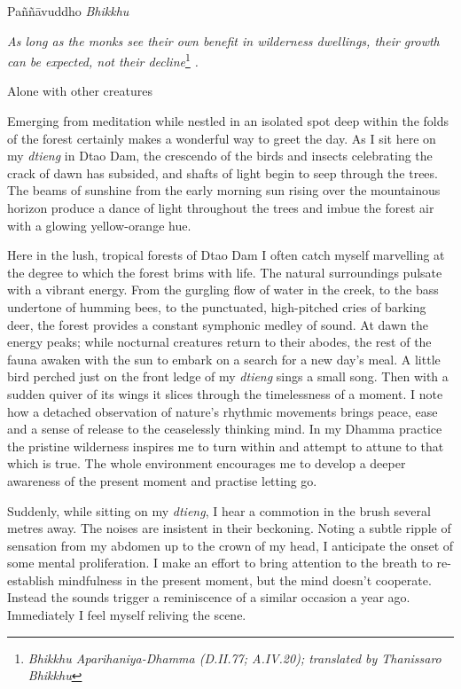 
Paññāvuddho \emph{Bhikkhu}

\emph{As long as the monks see their own benefit in wilderness
dwellings, their growth can be expected, not their decline}\footnote{\emph{Bhikkhu
  Aparihaniya-Dhamma (D.II.77; A.IV.20); translated by Thanissaro
  Bhikkhu}} \emph{.}

Alone with other creatures

Emerging from meditation while nestled in an isolated spot deep within
the folds of the forest certainly makes a wonderful way to greet the
day. As I sit here on my \emph{dtieng} in Dtao Dam, the crescendo of the
birds and insects celebrating the crack of dawn has subsided, and shafts
of light begin to seep through the trees. The beams of sunshine from the
early morning sun rising over the mountainous horizon produce a dance of
light throughout the trees and imbue the forest air with a glowing
yellow-orange hue.

Here in the lush, tropical forests of Dtao Dam I often catch myself
marvelling at the degree to which the forest brims with life. The
natural surroundings pulsate with a vibrant energy. From the gurgling
flow of water in the creek, to the bass undertone of humming bees, to
the punctuated, high-pitched cries of barking deer, the forest provides
a constant symphonic medley of sound. At dawn the energy peaks; while
nocturnal creatures return to their abodes, the rest of the fauna awaken
with the sun to embark on a search for a new day's meal. A little bird
perched just on the front ledge of my \emph{dtieng} sings a small song.
Then with a sudden quiver of its wings it slices through the
timelessness of a moment. I note how a detached observation of nature's
rhythmic movements brings peace, ease and a sense of release to the
ceaselessly thinking mind. In my Dhamma practice the pristine wilderness
inspires me to turn within and attempt to attune to that which is true.
The whole environment encourages me to develop a deeper awareness of the
present moment and practise letting go.

Suddenly, while sitting on my \emph{dtieng}, I hear a commotion in the
brush several metres away. The noises are insistent in their beckoning.
Noting a subtle ripple of sensation from my abdomen up to the crown of
my head, I anticipate the onset of some mental proliferation. I make an
effort to bring attention to the breath to re-establish mindfulness in
the present moment, but the mind doesn't cooperate. Instead the sounds
trigger a reminiscence of a similar occasion a year ago. Immediately I
feel myself reliving the scene.

